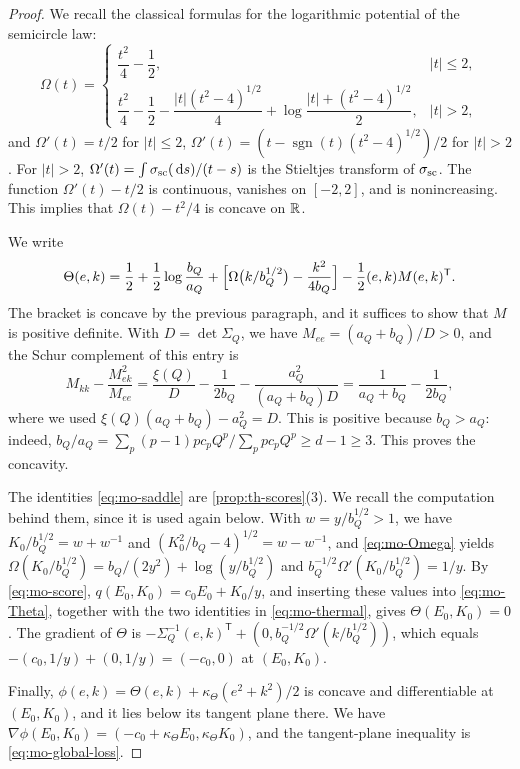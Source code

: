 \begin{proof}
We recall the classical formulas for the logarithmic potential of the semicircle law:
\begin{equation}\label{eq:mo-Omega}
\Omega(t)=\begin{cases}\dfrac{t^2}4-\dfrac12,&|t|\le2,\\[2mm]
\dfrac{t^2}4-\dfrac12-\dfrac{|t|(t^2-4)^{1/2}}4+\log\dfrac{|t|+(t^2-4)^{1/2}}2,&|t|>2,\end{cases}
\end{equation}
and $\Omega'(t)=t/2$ for $|t|\le2$, $\Omega'(t)=(t-\operatorname{sgn}(t)(t^2-4)^{1/2})/2$ for $|t|>2$. For $|t|>2$, $\Omega'(t)=\int\sigma_{\rm sc}(\,\mathrm d s)/(t-s)$ is the Stieltjes transform of $\sigma_{\rm sc}$. The function $\Omega'(t)-t/2$ is continuous, vanishes on $[-2,2]$, and is nonincreasing. This implies that $\Omega(t)-t^2/4$ is concave on $\mathbb R$.

We write
\[
\Theta(e,k)=\frac12+\frac12\log\frac{b_Q}{a_Q}+\Bigl[\Omega\bigl(k/b_Q^{1/2}\bigr)-\frac{k^2}{4b_Q}\Bigr]-\frac12(e,k)M(e,k)^{\mathsf T}.
\]
The bracket is concave by the previous paragraph, and it suffices to show that $M$ is positive definite. With $D=\det\Sigma_Q$, we have $M_{ee}=(a_Q+b_Q)/D>0$, and the Schur complement of this entry is
\[
M_{kk}-\frac{M_{ek}^2}{M_{ee}}=\frac{\xi(Q)}D-\frac1{2b_Q}-\frac{a_Q^2}{(a_Q+b_Q)D}=\frac1{a_Q+b_Q}-\frac1{2b_Q},
\]
where we used $\xi(Q)(a_Q+b_Q)-a_Q^2=D$. This is positive because $b_Q>a_Q$: indeed, $b_Q/a_Q=\sum_p(p-1)pc_pQ^p/\sum_ppc_pQ^p\ge d-1\ge3$. This proves the concavity.

The identities \eqref{eq:mo-saddle} are \cref{prop:th-scores}(3). We recall the computation behind them, since it is used again below. With $w=y/b_Q^{1/2}>1$, we have $K_0/b_Q^{1/2}=w+w^{-1}$ and $(K_0^2/b_Q-4)^{1/2}=w-w^{-1}$, and \eqref{eq:mo-Omega} yields $\Omega(K_0/b_Q^{1/2})=b_Q/(2y^2)+\log(y/b_Q^{1/2})$ and $b_Q^{-1/2}\Omega'(K_0/b_Q^{1/2})=1/y$. By \eqref{eq:mo-score}, $q(E_0,K_0)=c_0E_0+K_0/y$, and inserting these values into \eqref{eq:mo-Theta}, together with the two identities in \eqref{eq:mo-thermal}, gives $\Theta(E_0,K_0)=0$. The gradient of $\Theta$ is $-\Sigma_Q^{-1}(e,k)^{\mathsf T}+(0,b_Q^{-1/2}\Omega'(k/b_Q^{1/2}))$, which equals $-(c_0,1/y)+(0,1/y)=(-c_0,0)$ at $(E_0,K_0)$.

Finally, $\phi(e,k)=\Theta(e,k)+\kappa_\Theta(e^2+k^2)/2$ is concave and differentiable at $(E_0,K_0)$, and it lies below its tangent plane there. We have $\nabla\phi(E_0,K_0)=(-c_0+\kappa_\Theta E_0,\kappa_\Theta K_0)$, and the tangent-plane inequality is \eqref{eq:mo-global-loss}.
\end{proof}

